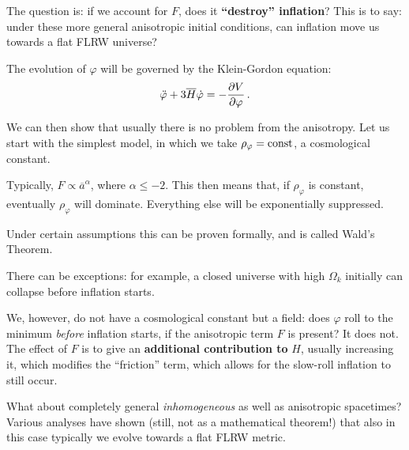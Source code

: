 \documentclass[main.tex]{subfiles}
\begin{document}
The question is: if we account for \(F\), does it \textbf{``destroy'' inflation}? 
This is to say: under these more general anisotropic initial conditions, can inflation move us towards a flat FLRW universe? 

The evolution of \(\varphi \) will be governed by the Klein-Gordon equation:
%
\begin{align}
\ddot{\varphi} + 3 \overline{H} \dot{\varphi} = - \pdv{V}{\varphi }
\,.
\end{align}

We can then show that usually there is no problem from the anisotropy. 
Let us start with the simplest model, in which we take \(\rho _\varphi = \text{const}\), a cosmological constant. 

Typically, \(F \propto \overline{a}^{\alpha }\), where \(\alpha \leq -2\). This then means that, if \(\rho _\varphi \) is constant, eventually \(\rho _\varphi \) will dominate. 
Everything else will be exponentially suppressed. 

Under certain assumptions this can be proven formally, and is called Wald's Theorem. 

There can be exceptions: for example, a closed universe with high \(\Omega _k\) initially can collapse before inflation starts. 

We, however, do not have a cosmological constant but a field: does \(\varphi \) roll to the minimum \emph{before} inflation starts, if the anisotropic term \(F\) is present?
It does not. The effect of \(F\) is to give an \textbf{additional contribution to} \(H\), usually increasing it, which modifies the ``friction'' term, which allows for the slow-roll inflation to still occur.

What about completely general \emph{inhomogeneous} as well as anisotropic spacetimes? 
Various analyses have shown (still, not as a mathematical theorem!) that also in this case typically we evolve towards a flat FLRW metric.
\end{document}
